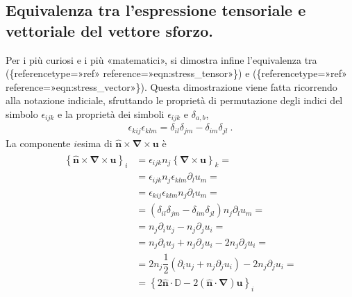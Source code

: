 \documentclass[letterpaper,10pt,italian]{jupyterBook}
\begin{document}
\subsection{Equivalenza tra l’espressione tensoriale e vettoriale del vettore sforzo.}
\label{\detokenize{polimi/fluidmechanics-ita/template/capitoli/06_slnEsatte/0600in:equivalenza-tra-l-espressione-tensoriale-e-vettoriale-del-vettore-sforzo}}
\sphinxAtStartPar
Per i più curiosi e i più «matematici», si dimostra infine l’equivalenza
tra (\{reference\sphinxhyphen{}type=»ref»
reference=»eqn:stress\_tensor»\}) e
(\{reference\sphinxhyphen{}type=»ref»
reference=»eqn:stress\_vector»\}). Questa dimostrazione viene fatta
ricorrendo alla notazione indiciale, sfruttando le proprietà di
permutazione degli indici del simbolo \(\epsilon_{ijk}\) e la proprietà
dei simboli \(\epsilon_{ijk}\) e \(\delta_{a,b}\),
\begin{equation*}
\begin{split}\epsilon_{kij}\epsilon_{klm} = \delta_{il}\delta_{jm} - \delta_{im}\delta_{jl} \ .\end{split}
\end{equation*}
\sphinxAtStartPar
La componente \(i\)\sphinxhyphen{}esima di
\(\mathbf{\hat{n}} \times \mathbf{\nabla} \times \mathbf{u}\) è
\begin{equation*}
\begin{split}\begin{aligned}
 \left\{ \mathbf{\hat{n}} \times \mathbf{\nabla} \times \mathbf{u} \right\}_i & =
 \epsilon_{ijk} n_j \left\{ \mathbf{\nabla} \times \mathbf{u} \right\}_k = \\
  & = \epsilon_{ijk} n_j \epsilon_{klm} \partial_l u_m = \\
  & = \epsilon_{kij} \epsilon_{klm} n_j \partial_l u_m = \\
  & = (\delta_{il}\delta_{jm} - \delta_{im}\delta_{jl} ) n_j \partial_l u_m = \\
  & = n_j \partial_i u_j - n_j \partial_j u_i = \\
  & = n_j \partial_i u_j + n_j \partial_j u_i - 2 n_j \partial_j u_i = \\
  & = 2 n_j \dfrac{1}{2}\left(\partial_i u_j + n_j \partial_j u_i \right) - 2 n_j \partial_j u_i = \\
  & = \left\{2 \mathbf{\hat{n}} \cdot \mathbb{D} - 2 ( \mathbf{\hat{n}} \cdot \mathbf{\nabla} ) \mathbf{u} \right\}_i
\end{aligned}\end{split}
\end{equation*}
\end{document}
